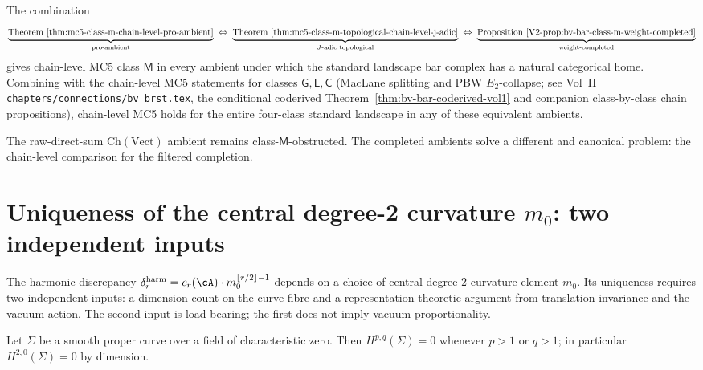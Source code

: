 \begin{remark}
\label{rem:mc5-scope-and-landscape-coverage}
The combination
\[
\underbrace{
\text{Theorem~\ref{thm:mc5-class-m-chain-level-pro-ambient}}
}_{\mathrm{pro\text{-}ambient}}
\;\Leftrightarrow\;
\underbrace{
\text{Theorem~\ref{thm:mc5-class-m-topological-chain-level-j-adic}}
}_{J\text{-adic topological}}
\;\Leftrightarrow\;
\underbrace{
\text{Proposition~\ref{V2-prop:bv-bar-class-m-weight-completed}}
}_{\mathrm{weight\text{-}completed}}
\]
gives chain-level MC5 class $\mathsf{M}$ in every ambient under which
the standard landscape bar complex has a natural categorical home.
Combining with the chain-level MC5 statements for classes
$\mathsf{G}, \mathsf{L}, \mathsf{C}$
\textup{(}MacLane splitting and PBW $E_2$-collapse; see
Vol~II \texttt{chapters/connections/bv\_brst.tex},
the conditional coderived Theorem~\textup{\ref{thm:bv-bar-coderived-vol1}}
and companion class-by-class chain propositions\textup{)}, chain-level MC5 holds for the
entire four-class standard landscape in any of these equivalent
ambients.

The raw-direct-sum $\mathrm{Ch}(\mathrm{Vect})$ ambient remains
class-$\mathsf{M}$-obstructed. The completed ambients solve a different
and canonical problem: the chain-level comparison for the filtered
completion.
\end{remark}

\section{Uniqueness of the central degree-2 curvature $m_0$: two
 independent inputs}
\label{sec:mc5-central-m0-uniqueness}

The harmonic discrepancy
$\delta_r^{\mathrm{harm}} = c_r(\cA) \cdot m_0^{\lfloor r/2 \rfloor - 1}$
depends on a choice of central degree-2 curvature element $m_0$.  Its
uniqueness requires two independent inputs: a dimension count on the curve
fibre and a representation-theoretic argument from translation invariance
and the vacuum action.  The second input is load-bearing; the first does not
imply vacuum proportionality.

\begin{lemma}
\label{lem:curve-H20-vanishing}
Let $\Sigma$ be a smooth proper curve over a field of characteristic
zero. Then $H^{p,q}(\Sigma) = 0$ whenever $p > 1$ or $q > 1$; in
particular $H^{2,0}(\Sigma) = 0$ by dimension.
\ClaimStatusProvedElsewhere{}
\end{lemma}

